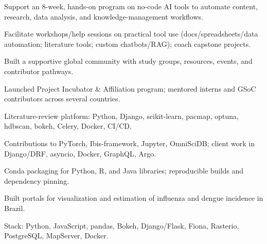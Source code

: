 \documentclass[10pt,a4paper]{article}
\begin{document}
\begin{tightitemize}
  \item Support an 8-week, hands-on program on no-code AI tools to automate content, research, data analysis, and knowledge-management workflows.
  \item Facilitate workshops/help sessions on practical tool use (docs/spreadsheets/data automation; literature tools; custom chatbots/RAG); coach capstone projects.
\end{tightitemize}

\begin{tightitemize}
  \item Built a supportive global community with study groups, resources, events, and contributor pathways.
  \item Launched Project Incubator \& Affiliation program; mentored interns and GSoC contributors across several countries.
\end{tightitemize}

\begin{tightitemize}
  \item Literature-review platform: Python, Django, scikit-learn, pacmap, optuna, hdbscan, bokeh, Celery, Docker, CI/CD.
\end{tightitemize}

\begin{tightitemize}
  \item Contributions to PyTorch, Ibis-framework, Jupyter, OmniSciDB; client work in Django/DRF, asyncio, Docker, GraphQL, Argo.
\end{tightitemize}

\begin{tightitemize}
  \item Conda packaging for Python, R, and Java libraries; reproducible builds and dependency pinning.
\end{tightitemize}

\begin{tightitemize}
  \item Built portals for visualization and estimation of influenza and dengue incidence in Brazil.
  \item Stack: Python, JavaScript, pandas, Bokeh, Django/Flask, Fiona, Rasterio, PostgreSQL, MapServer, Docker.
\end{tightitemize}
\end{document}
